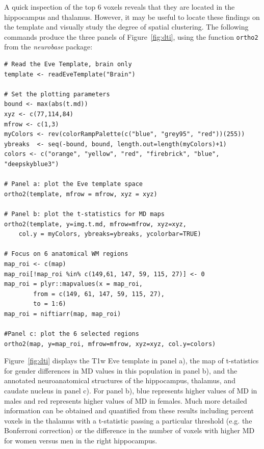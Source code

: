 \documentclass[]{elsarticle} %
\newcommand{\code}[1]{\texttt{#1}}
\newcommand{\pkg}[1]{\emph{#1}}
\begin{document}
A quick inspection of the top $6$ voxels reveals that they are located in the hippocampus and thalamus. However, it may be  useful to locate these findings on the template and visually study the degree of spatial clustering. The following commands produce the three panels of Figure~\ref{fig:dti}, using the function \code{ortho2} from the \pkg{neurobase} package:
\color{blue}
\begin{verbatim}
# Read the Eve Template, brain only
template <- readEveTemplate("Brain")

# Set the plotting parameters
bound <- max(abs(t.md))
xyz <- c(77,114,84)
mfrow <- c(1,3)
myColors <- rev(colorRampPalette(c("blue", "grey95", "red"))(255))
ybreaks  <- seq(-bound, bound, length.out=length(myColors)+1)
colors <- c("orange", "yellow", "red", "firebrick", "blue", "deepskyblue3")

# Panel a: plot the Eve template space
ortho2(template, mfrow = mfrow, xyz = xyz)

# Panel b: plot the t-statistics for MD maps
ortho2(template, y=img.t.md, mfrow=mfrow, xyz=xyz, 
    col.y = myColors, ybreaks=ybreaks, ycolorbar=TRUE)

# Focus on 6 anatomical WM regions 
map_roi <- c(map)
map_roi[!map_roi %in% c(149,61, 147, 59, 115, 27)] <- 0
map_roi = plyr::mapvalues(x = map_roi, 
		from = c(149, 61, 147, 59, 115, 27),
		to = 1:6)
map_roi = niftiarr(map, map_roi)

#Panel c: plot the 6 selected regions
ortho2(map, y=map_roi, mfrow=mfrow, xyz=xyz, col.y=colors)
\end{verbatim}
\color{black}

Figure~\ref{fig:dti} displays the T1w Eve template in panel a), the map of t-statistics for gender differences in MD values in this population in panel b), and the annotated neuroanatomical structures of the hippocampus, thalamus, and caudate nucleus in panel c).  For panel b), blue represents higher values of MD in males and red represents higher values of MD in females. Much more detailed information can be obtained and quantified from these results including percent voxels in the thalamus with a t-statistic passing a particular threshold (e.g. the Bonferroni correction) or the difference in the number of voxels with higher MD for women versus men in the right hippocampus.
\end{document}
